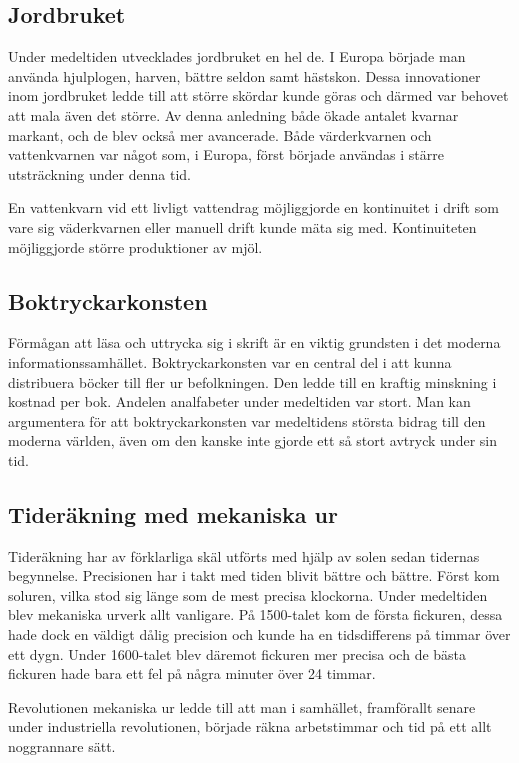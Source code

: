 \documentclass[a4paper,12pt,fleqn]{article}
\begin{document}
\subsection{Jordbruket}

Under medeltiden utvecklades jordbruket en hel de. I Europa började man använda hjulplogen, harven, bättre seldon samt hästskon. Dessa innovationer inom jordbruket ledde till att större skördar kunde göras och därmed var behovet att mala även det större. Av denna anledning både ökade antalet kvarnar markant, och de blev också mer avancerade. Både värderkvarnen och vattenkvarnen var något som, i Europa, först började användas i stärre utsträckning under denna tid. 

En vattenkvarn vid ett livligt vattendrag möjliggjorde en kontinuitet i drift som vare sig väderkvarnen eller manuell drift kunde mäta sig med. Kontinuiteten möjliggjorde större produktioner av mjöl. 

\subsection{Boktryckarkonsten}

Förmågan att läsa och uttrycka sig i skrift är en viktig grundsten i det moderna informationssamhället. Boktryckarkonsten var en central del i att kunna distribuera böcker till fler ur befolkningen. Den ledde till en kraftig minskning i kostnad per bok. Andelen analfabeter under medeltiden var stort. Man kan argumentera för att boktryckarkonsten var medeltidens största bidrag till den moderna världen, även om den kanske inte gjorde ett så stort avtryck under sin tid. 

\subsection{Tideräkning med mekaniska ur}

Tideräkning har av förklarliga skäl utförts med hjälp av solen sedan tidernas begynnelse. Precisionen har i takt med tiden blivit bättre och bättre. Först kom soluren, vilka stod sig länge som de mest precisa klockorna. Under medeltiden blev mekaniska urverk allt vanligare. På 1500-talet kom de första fickuren, dessa hade dock en väldigt dålig precision och kunde ha en tidsdifferens på timmar över ett dygn. Under 1600-talet blev däremot fickuren mer precisa och de bästa fickuren hade bara ett fel på några minuter över 24 timmar. 

Revolutionen mekaniska ur ledde till att man i samhället, framförallt senare under industriella revolutionen, började räkna arbetstimmar och tid på ett allt noggrannare sätt. 
\end{document}
